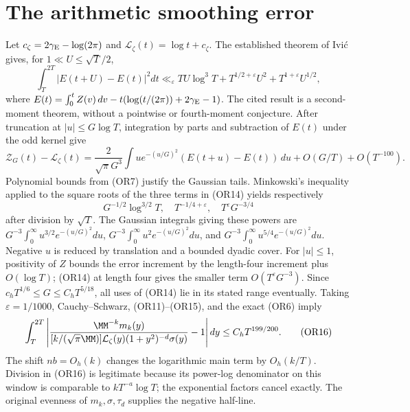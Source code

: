 \section{The arithmetic smoothing error}
Let \(c_\zeta=2\gamma_{\rm E}-\log(2\pi)\) and
\(\mathcal L_\zeta(t)=\log t+c_\zeta\).  The established theorem
of Ivi\'c \cite[Section 2, (2.1) and its stated \(E\)-analogue]{or:Ivic}
gives, for \(1\ll U\leq\sqrt T/2\),
\[
 \int_T^{2T}|E(t+U)-E(t)|^2dt
 \ll_\varepsilon TU\log^3 T+
 T^{1/2+\varepsilon}U^2+T^{1+\varepsilon}U^{1/2},       \tag{OR14}
\]
where \(E(t)=\int_0^tZ(v)\,dv-t(\log(t/(2\pi))+2\gamma_{\rm E}-1)\).
The cited result is a second-moment theorem, without a pointwise or
fourth-moment conjecture.
After truncation at \(|u|\leq G\log T\), integration by parts and
subtraction of \(E(t)\) under the odd kernel give
\[
 \mathcal Z_G(t)-\mathcal L_\zeta(t)
 =\frac2{\sqrt\pi G^3}\int
 u e^{-(u/G)^2}(E(t+u)-E(t))\,du+O(G/T)+O(T^{-100}).
 \tag{OR15}
\]
Polynomial bounds from (OR7) justify the Gaussian tails.  Minkowski's
inequality applied to the square roots of the three terms in
(OR14) yields respectively
\[
 G^{-1/2}\log^{3/2}T,\quad
 T^{-1/4+\varepsilon},\quad T^\varepsilon G^{-3/4}
\]
after division by \(\sqrt T\).  The Gaussian integrals giving these
powers are \(G^{-3}\int_0^\infty u^{3/2}e^{-(u/G)^2}du\),
\(G^{-3}\int_0^\infty u^2e^{-(u/G)^2}du\), and
\(G^{-3}\int_0^\infty u^{5/4}e^{-(u/G)^2}du\).
Negative \(u\) is reduced by translation and a bounded dyadic cover.
For \(|u|\leq1\), positivity of \(Z\) bounds the error increment by
the length-four increment plus \(O(\log T)\); (OR14) at length four
gives the smaller term \(O(T^\varepsilon G^{-3})\).
Since
\(c_hT^{1/6}\leq G\leq C_hT^{5/18}\), all uses of (OR14) lie in
its stated range eventually.  Taking \(\varepsilon=1/1000\),
Cauchy--Schwarz, (OR11)--(OR15), and the exact (OR6) imply
\[
 \int_T^{2T}\left|
 \frac{\MM^{-k}m_k(y)}
 { [k/(\sqrt\pi\MM)]\mathcal L_\zeta(y)(1+y^2)^{-d}\sigma(y)}
 -1\right|dy\leq C_hT^{199/200}.                      \tag{OR16}
\]
The shift \(nb=O_h(k)\) changes the logarithmic main term by
\(O_h(k/T)\).  Division in (OR16) is legitimate because its
power-log denominator on this window is comparable to
\(kT^{-a}\log T\); the exponential factors cancel exactly.
The original evenness of \(m_k,\sigma,\tau_d\) supplies the negative
half-line.


